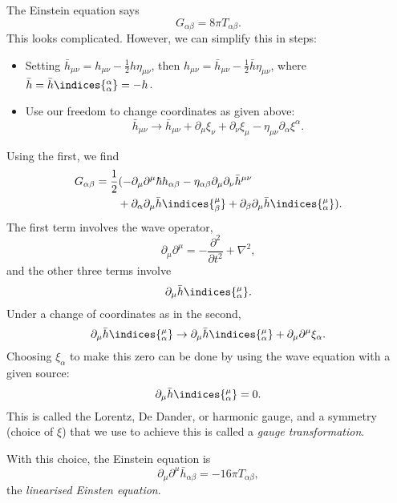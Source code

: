 \documentclass[12pt]{article}
\begin{document}
The Einstein equation says
\[
G_{\alpha\beta} = 8 \pi T_{\alpha\beta}.
\]
This looks complicated. However, we can simplify this in steps:
\begin{itemize}
	\item Setting $\bar h_{\mu\nu} = h_{\mu\nu} - \frac{1}{2} h \eta_{\mu\nu}$, then $h_{\mu\nu} = \bar h_{\mu\nu} - \frac{1}{2} \bar h \eta_{\mu\nu}$, where $\bar h = \bar h\indices{_{\alpha}^\alpha} = -h$.
	\item Use our freedom to change coordinates as given above:
		\[
		\bar h_{\mu\nu} \to \bar h_{\mu\nu} + \partial_\mu \xi_\nu + \partial_\nu \xi_\mu - \eta_{\mu\nu} \partial_\alpha \xi^\alpha.
		\]
\end{itemize}
Using the first, we find
\begin{align*}
	G_{\alpha\beta} &= \frac{1}{2} ( - \partial_\mu \partial^\mu \hbar h_{\alpha\beta} - \eta_{\alpha\beta} \partial_\mu \partial_\nu \bar h^{\mu\nu} \\
			& \qquad + \partial_\alpha \partial_\mu \bar h \indices{_{\beta}^\mu} + \partial_\beta \partial_\mu \bar h\indices{_{\alpha}^\mu}).
\end{align*}
The first term involves the wave operator,
\[
	\partial_\mu \partial^\mu = - \frac{\partial^2}{\partial t^2} + \nabla^2,
\]
and the other three terms involve
\[
\partial_\mu \bar h\indices{_{\alpha}^\mu}.
\]
Under a change of coordinates as in the second,
\[
\partial_\mu \bar h\indices{_{\alpha}^\mu} \to \partial_\mu \bar h\indices{_{\alpha}^\mu} + \partial_\mu \partial^\mu \xi_\alpha.
\]
Choosing $\xi_\alpha$ to make this zero can be done by using the wave equation with a given source:
\[
\partial_\mu \bar h\indices{_{\alpha}^\mu} = 0.
\]
This is called the Lorentz, De Dander, or harmonic gauge, and a symmetry (choice of $\xi$) that we use to achieve this is called a \emph{gauge transformation}.

With this choice, the Einstein equation is
\[
	\partial_\mu \partial^\mu \bar h_{\alpha\beta} = - 16 \pi T_{\alpha\beta},
\]
the \emph{linearised Einsten equation}.
\end{document}
